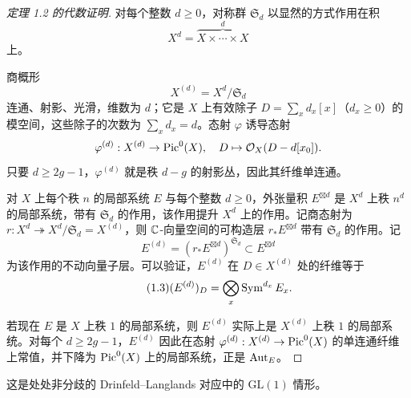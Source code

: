 \begin{proof}[定理 1.2 的代数证明]
对每个整数 $d\ge 0$，对称群 $\mathfrak{S}_d$ 以显然的方式作用在积
\[
  X^{d}=\overbrace{X\times\cdots\times X}^{d}
\]
上。

商概形
\[
  X^{(d)}=X^{d}/\mathfrak{S}_d
\]
连通、射影、光滑，维数为 $d$；它是 $X$ 上有效除子 $D=\sum_x d_x[x]$（$d_x\ge 0$）的模空间，这些除子的次数为 $\sum_x d_x=d$。态射 $\varphi$ 诱导态射
\[
  \varphi^{(d)}:X^{(d)}\to\operatorname{Pic}^{0}(X),\quad D\mapsto\mathcal{O}_X(D-d[x_0]).
\]
只要 $d\ge 2g-1$，$\varphi^{(d)}$ 就是秩 $d-g$ 的射影丛，因此其纤维单连通。

对 $X$ 上每个秩 $n$ 的局部系统 $E$ 与每个整数 $d\ge 0$，外张量积 $E^{\boxtimes d}$ 是 $X^{d}$ 上秩 $n^{d}$ 的局部系统，带有 $\mathfrak{S}_d$ 的作用，该作用提升 $X^{d}$ 上的作用。记商态射为 $r:X^{d}\twoheadrightarrow X^{d}/\mathfrak{S}_d=X^{(d)}$，则 $\mathbb{C}$-向量空间的可构造层 $r_{*}E^{\boxtimes d}$ 带有 $\mathfrak{S}_d$ 的作用。记
\[
  E^{(d)}=(r_{*}E^{\boxtimes d})^{\mathfrak{S}_d}\subset E^{\boxtimes d}
\]
为该作用的不动向量子层。可以验证，$E^{(d)}$ 在 $D\in X^{(d)}$ 处的纤维等于
\[
  \tag*{(1.3)} (E^{(d)})_D=\bigotimes_x\operatorname{Sym}^{d_x}E_x.
\]

若现在 $E$ 是 $X$ 上秩 $1$ 的局部系统，则 $E^{(d)}$ 实际上是 $X^{(d)}$ 上秩 $1$ 的局部系统。对每个 $d\ge 2g-1$，$E^{(d)}$ 因此在态射 $\varphi^{(d)}:X^{(d)}\to\operatorname{Pic}^{0}(X)$ 的单连通纤维上常值，并下降为 $\operatorname{Pic}^{0}(X)$ 上的局部系统，正是 $\operatorname{Aut}_E$。
\end{proof}

这是处处非分歧的 Drinfeld--Langlands 对应中的 $\mathrm{GL}(1)$ 情形。
